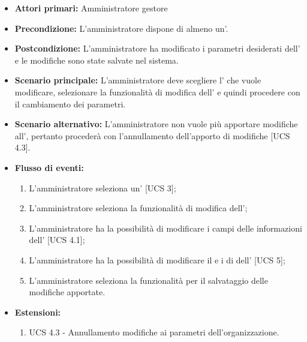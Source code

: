 \begin{itemize}
    \item \textbf{Attori primari:} Amministratore gestore
    \item \textbf{Precondizione:} L'amministratore dispone di almeno un'.
    \item \textbf{Postcondizione:} L'amministratore ha modificato i parametri desiderati dell' e le modifiche sono state salvate nel sistema.
    \item \textbf{Scenario principale:} L'amministratore deve scegliere l' che vuole modificare, selezionare la funzionalità di modifica dell' e quindi procedere con il cambiamento dei parametri.
    \item \textbf{Scenario alternativo:} L'amministratore non vuole più apportare modifiche all', pertanto procederà con l'annullamento dell'apporto di modifiche [UCS 4.3].
    \item \textbf{Flusso di eventi:}
    \begin{enumerate}
        \item L'amministratore seleziona un' [UCS 3];
        \item L'amministratore seleziona la funzionalità di modifica dell';
        \item L'amministratore ha la possibilità di modificare i campi delle informazioni dell' [UCS 4.1];
        \item L'amministratore ha la possibilità di modificare il  e i  di  dell' [UCS 5];
        \item L'amministratore seleziona la funzionalità per il salvataggio delle modifiche apportate.
    \end{enumerate}
    \item \textbf{Estensioni:}
    \begin{enumerate}
        \item UCS 4.3 - Annullamento modifiche ai parametri dell'organizzazione.
    \end{enumerate}
\end{itemize}
\newpage
